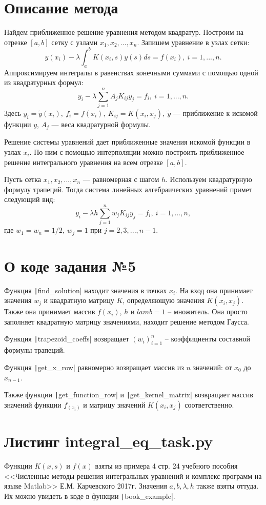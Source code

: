 \section{Описание метода}
Найдем приближенное решение уравнения методом квадратур. Построим на отрезке $[a, b]$ сетку с узлами
$x_1, x_2, . . . , x_n$. Запишем уравнение в узлах сетки:
$$y(x_i) - \lambda\int_a^bK(x_i,s)y(s)ds = f(x_i),\ i=1,...,n.$$
Аппроксимируем интегралы в равенствах конечными суммами с
помощью одной из квадратурных формул:
$$y_i - \lambda\sum_{j=1}^nA_jK_{ij}y_j = f_i,\ i=1,...,n.$$
Здесь $y_i = \widetilde y(x_i),\ f_i = f(x_i),\ K_{ij} = K(x_i, x_j),\ \widetilde y$ — приближение к
искомой функции $y$, $A_j$ — веса квадратурной формулы.


Решение системы уравнений дает приближенные значения искомой функции в узлах $x_i$. По ним с помощью интерполяции можно построить приближенное решение интегрального уравнения на всем отрезке $[a, b]$.

Пусть сетка $x_1, x_2, . . . , x_n$ — равномерная с шагом $h$. Используем квадратурную формулу трапеций. Тогда система линейных
алгебраических уравнений примет следующий вид:
$$y_i - \lambda h\sum_{j=1}^nw_jK_{ij}y_j = f_i,\ i=1,...,n,$$
где $w_1 = w_n = 1/2,\ w_j = 1$ при $j = 2, 3, . . . , n - 1$.

\section{О коде задания №5}
Функция \texttt|find_solution| находит значения в точках $x_i$. На вход она принимает значения $w_j$ и квадратную матрицу $K$, определяющую значения $K(x_i, x_j)$. Также она принимает массив $f(x_i)$, $h$ и $lamb=1$ -- множитель.
Она просто заполняет квадратную матрицу значениями, находит решение методом Гаусса.

Функция \texttt|trapezoid_coeffs| возвращает $(w_i)_{i=1}^n$ -- коэффициенты составной формулы трапеций. 

Функция \texttt|get_x_row| равномерно возвращает массив из $n$ значений: от $x_0$ до $x_{n-1}$.

Также функции \texttt|get_function_row| и \texttt|get_kernel_matrix| возвращает массив значений функции $f_(x_i)$ и матрицу значений $K(x_i, x_j)$ соответственно.

\section{Листинг integral\_eq\_task.py}
Функции $K(x,s)$ и $f(x)$ взяты из примера 4 стр. 24 учебного пособия <<Численные методы решения интегральных уравнений и комплекс программ на языке Matlab>>  Е.М. Карчевского 2017г.
Значения $a,b,\lambda,h$ также взяты оттуда.
Их можно увидеть в коде в функции \texttt|book_example|.
\inputminted{python}{code/integral_eq_task.py}

